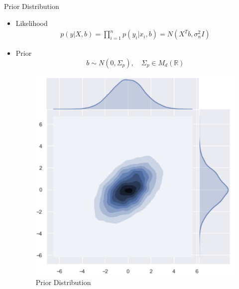 \documentclass[10pt]{beamer}
\begin{document}
\begin{frame}{Prior Distribution}
\begin{itemize}
\item Likelihood
\begin{align*}
p(y|X, b) 
= \prod_{i=1}^{n}p(y_i|x_i, b) 
= N(X^T b, \sigma_n^2 I)
\end{align*}

\item Prior 
$$
b \sim N(0, \Sigma_p), \quad  \Sigma_p \in M_{d}(\mathbb{R})
$$

\begin{center}
\begin{figure}
\includegraphics[scale=0.2]{images/lin_join_prior.png} 
\caption{Prior Distribution}
\end{figure}
\end{center}
\end{itemize}
\end{frame}
\end{document}
